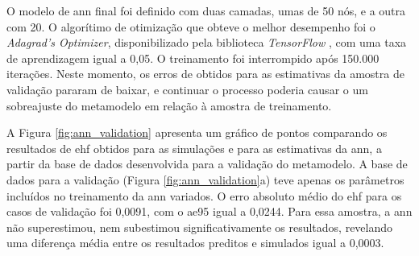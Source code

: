 \documentclass[brazil,hardcopy,openany]{ufscthesis} %
\begin{document}
O modelo de \acrshort{ann} final foi definido com duas camadas, umas de 50 nós, e a outra com 20. 
O algorítimo de otimização que obteve o melhor desempenho foi o \textit{Adagrad's Optimizer}, disponibilizado pela biblioteca \textit{TensorFlow} \cite{tensorflow2015}, com uma taxa de aprendizagem igual a 0,05. O treinamento foi interrompido após 150.000 iterações. Neste momento, os erros de obtidos para as estimativas da amostra de validação pararam de baixar, e continuar o processo poderia causar o um sobreajuste do metamodelo em relação à amostra de treinamento.

A Figura \ref{fig:ann_validation} apresenta um gráfico de pontos comparando os resultados de \acrshort{ehf} obtidos para as simulações e para as estimativas da \acrshort{ann}, a partir da base de dados desenvolvida para a validação do metamodelo. A base de dados para a validação (Figura \ref{fig:ann_validation}a) teve apenas os parâmetros incluídos no treinamento da \acrshort{ann} variados. 
O erro absoluto médio do \acrshort{ehf} para os casos de validação foi 0,0091, com o \acrshort{ae95} igual a 0,0244.
Para essa amostra, a \acrshort{ann} não superestimou, nem subestimou significativamente os resultados, revelando uma diferença média entre os resultados preditos e simulados igual a 0,0003.
\end{document}
